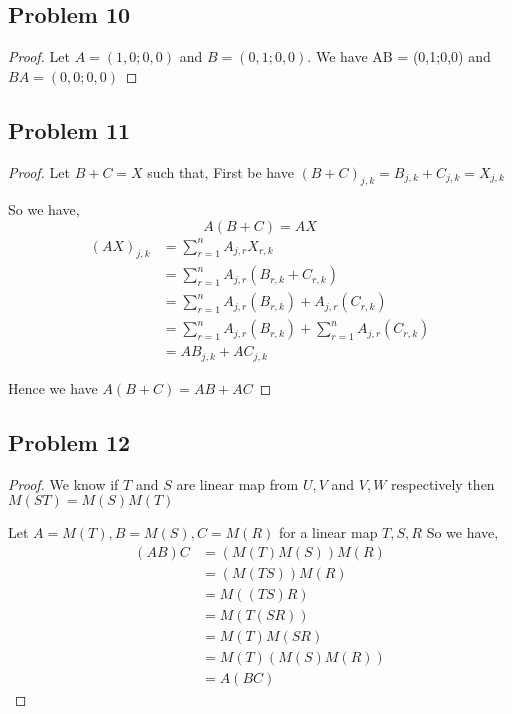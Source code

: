 \documentclass[a4paper]{report}
\begin{document}
\subsection*{Problem 10}
\begin{proof}
    Let $A = (1,0;0,0)$ and $B = (0,1;0,0)$. We have AB = (0,1;0,0) and $BA = (0,0;0,0)$
\end{proof}

\subsection*{Problem 11}
\begin{proof}
    Let $B + C = X$ such that,
    First be have $(B + C)_{j,k} = B_{j,k} + C_{j,k} = X_{j,k}$

    So we have, 
    $$ A(B + C) = AX $$ 
    \begin{align*}
        (AX)_{j,k} &= \sum_{r=1}^{n} A_{j,r} X_{r,k}\\
                   &= \sum_{r=1}^{n} A_{j,r}(B_{r,k} + C_{r,k})\\
                   &= \sum_{r=1}^{n} A_{j,r}(B_{r,k})  + A_{j,r}(C_{r,k})\\
                   &= \sum_{r=1}^{n} A_{j,r}(B_{r,k})  + \sum_{r=1}^{n} A_{j,r}(C_{r,k})\\
                   &= AB_{j,k} + AC_{j,k}
    \end{align*}

    Hence we have $A(B + C) = AB + AC$
\end{proof}

\subsection*{Problem 12}
\begin{proof}
    We know if $T$ and $S$ are linear map from $U,V$ and $V,W$ respectively then $M(ST) = M(S)M(T)$

    Let  $A = M(T), B = M(S), C = M(R)$ for a linear map $T,S,R$ So we have, 
    \begin{align*}
        (AB)C &= (M(T)M(S))M(R)\\
              &= (M(TS))M(R)\\
              &= M((TS)R)\\
              &= M(T(SR))\\
              &= M(T)M(SR)\\
              &= M(T)(M(S)M(R))\\
              &= A(BC)
    \end{align*}

\end{proof}
\end{document}
